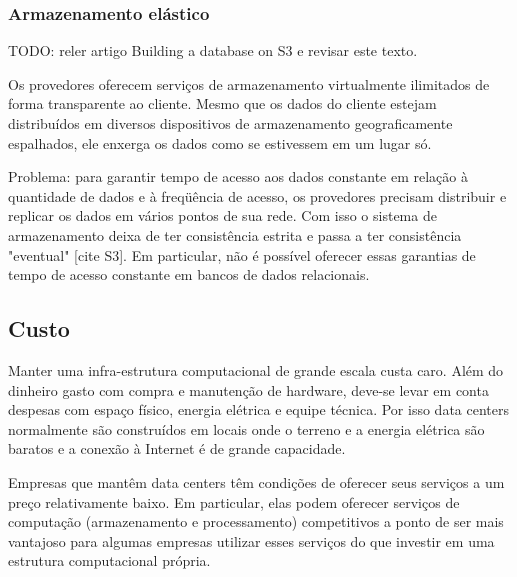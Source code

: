 \subsubsection{Armazenamento elástico}

TODO: reler artigo Building a database on S3 e revisar este texto.

Os provedores oferecem serviços de armazenamento virtualmente ilimitados de forma transparente ao cliente. Mesmo que os dados do cliente estejam distribuídos em diversos dispositivos de armazenamento geograficamente espalhados, ele enxerga os dados como se estivessem em um lugar só.

Problema: para garantir tempo de acesso aos dados constante em relação à quantidade de dados e à freqüência de acesso, os provedores precisam distribuir e replicar os dados em vários pontos de sua rede. Com isso o sistema de armazenamento deixa de ter consistência estrita e passa a ter consistência "eventual" [cite S3]. Em particular, não é possível oferecer essas garantias de tempo de acesso constante em bancos de dados relacionais.


\subsection{Custo}

Manter uma infra-estrutura computacional de grande escala custa caro. Além do dinheiro gasto com compra e manutenção de hardware, deve-se levar em conta despesas com espaço físico, energia elétrica e equipe técnica. Por isso data centers normalmente são construídos em locais onde o terreno e a energia elétrica são baratos e a conexão à Internet é de grande capacidade. 

Empresas que mantêm data centers 
têm condições de oferecer seus serviços a um preço relativamente baixo. Em particular, elas podem oferecer serviços de computação (armazenamento e processamento) competitivos a ponto de ser mais vantajoso para algumas empresas utilizar esses serviços do que investir em uma estrutura computacional própria.


